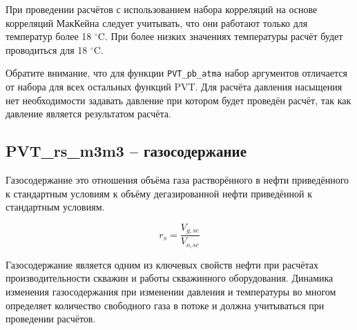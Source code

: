 

При проведении расчётов с использованием набора корреляций на основе корреляций МакКейна следует учитывать, что они работают только для температур более 18 $^\circ$C. При более низких значениях температуры расчёт будет проводиться для 18 $^\circ$C.

Обратите внимание, что для функции \texttt{PVT_pb_atma} набор аргументов отличается от набора для всех остальных функций PVT. Для расчёта давления насыщения нет необходимости задавать давление при котором будет проведён расчёт, так как давление является результатом расчёта.

\subsection{PVT\_rs\_m3m3 – газосодержание}

Газосодержание это отношения объёма газа растворённого в нефти приведённого к стандартным условиям к объёму дегазированной нефти приведённой к стандартным условиям. 

$$r_s = \frac{V_{g,sc}}{V_{o,sc}}$$

Газосодержание является одним из ключевых свойств нефти при расчётах производительности скважин и работы скважинного оборудования. Динамика изменения газосодержания при изменении давления и температуры во многом определяет количество свободного газа в потоке и должна учитываться при проведении расчётов. 

